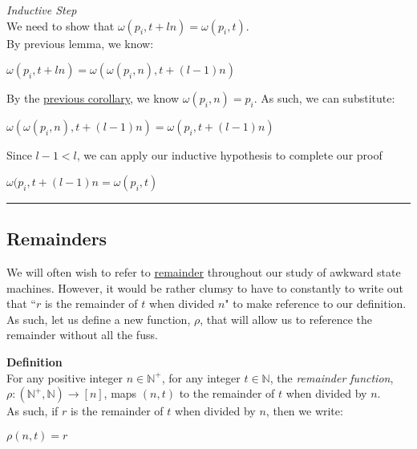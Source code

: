 \documentclass[a4paper,12pt]{article}
\begin{document}
\noindent
\textit{Inductive Step}\\
We need to show that $\omega(p_i, t + ln) = \omega(p_i, t)$.\\

\noindent By previous lemma, we know:
\begin{center}
$\omega(p_i, t + ln) = \omega(\omega(p_i, n), t + (l - 1)n)$
\end{center}

\noindent By the \hyperlink{corollary:inverse_omega_relationship}{previous corollary}, we know $\omega(p_i, n) = p_i$. As such, we can substitute:
\begin{center}
$\omega(\omega(p_i, n), t + (l - 1)n) = \omega(p_i, t + (l - 1)n)$
\end{center}

\noindent Since $l - 1 < l$, we can apply our inductive hypothesis to complete our proof
\begin{center}
$\omega(p_i, t + (l - 1)n = \omega(p_i, t)$
\end{center}


\begin{center}
\noindent\rule{8cm}{0.4pt}
\end{center}



\subsection{Remainders}
\label{sec:remainders}

We will often wish to refer to \hyperlink{theorem:remainder}{remainder} throughout our study of awkward state machines. However, it would be rather clumsy to have to constantly to write out that ``$r$ is the remainder of $t$ when divided $n$" to make reference to our definition. As such, let us define a new function, $\rho$, that will allow us to reference the remainder without all the fuss.\\


\begin{tcolorbox}
\textbf{Definition}\\
For any positive integer $n \in \mathbb{N^{+}}$, for any integer $t \in \mathbb{N}$, the \textit{remainder function}, $\rho: (\mathbb{N^{+}}, \mathbb{N}) \rightarrow [n]$, maps $(n, t)$ to the remainder of $t$ when divided by $n$.\\

\noindent As such, if $r$ is the remainder of $t$ when divided by $n$, then we write:
\begin{center}
$\rho(n, t) = r$
\end{center}
\end{tcolorbox}
\end{document}
